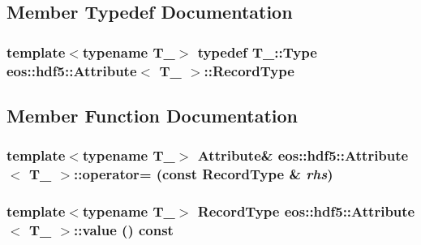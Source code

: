 \subsection{Member Typedef Documentation}
\hypertarget{classeos_1_1hdf5_1_1Attribute_a850f8d6a8627d113047d4c2b29d41430}{
\subsubsection[{RecordType}]{\setlength{\rightskip}{0pt plus 5cm}template$<$typename T\_\-$>$ typedef T\_\-::Type {\bf eos::hdf5::Attribute}$<$ T\_\- $>$::{\bf RecordType}}}
\label{classeos_1_1hdf5_1_1Attribute_a850f8d6a8627d113047d4c2b29d41430}


\subsection{Member Function Documentation}
\hypertarget{classeos_1_1hdf5_1_1Attribute_a949efcd5b6094a0e5bc88e67dee0ddc2}{
\subsubsection[{operator=}]{\setlength{\rightskip}{0pt plus 5cm}template$<$typename T\_\-$>$ {\bf Attribute}\& {\bf eos::hdf5::Attribute}$<$ T\_\- $>$::operator= (const {\bf RecordType} \& {\em rhs})}}
\label{classeos_1_1hdf5_1_1Attribute_a949efcd5b6094a0e5bc88e67dee0ddc2}
\hypertarget{classeos_1_1hdf5_1_1Attribute_a94f3f6fc67fe675a40cfd753da895030}{
\subsubsection[{value}]{\setlength{\rightskip}{0pt plus 5cm}template$<$typename T\_\-$>$ {\bf RecordType} {\bf eos::hdf5::Attribute}$<$ T\_\- $>$::value () const}}
\label{classeos_1_1hdf5_1_1Attribute_a94f3f6fc67fe675a40cfd753da895030}


